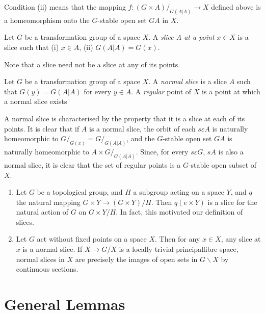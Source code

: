 Condition (ii) means that the mapping $f :(G \times A)/_{G(A | A)}
 \to X$ defined above is a homeomorphism onto the $G$-stable open set
 $GA$ in $X$. 

\begin{defi*}
  Let $G$ be a transformation group of a space $X$.  A \textit{slice A
    at a point} $x \in X$ is a slice such that (i) $x \in A$, (ii) $G(A |
  A)= G(x)$. 
\end{defi*} 
Note that a slice need not be a slice at any of its points.
 
\begin{defi*}
  Let $G$ be a transformation group of a space $X$. A \textit{normal
    slice} is a slice $A$ such that $G(y)=G(A|A)$ for every $y \in
  A$. A \textit{regular} point of $X$ is a point at which a normal
  slice exists  
\end{defi*} 

A normal slice is characterised by the property that it is a slice at
 each of its points. It is clear that if $A$ is a normal slice, the
 orbit of each $s \varepsilon A$ is naturally homeomorphic to
 $G/_{G(x)} = G/_{G(A|A)}$, and the $G$-stable open set $GA$ is
 naturally homeomorphic to $A \times G/_{G(A|A)}$. Since, for every $s
 \varepsilon G$, $sA$ is also a normal slice, it is clear that the set
 of regular points is a $G$-stable open subset of $X$. 

\begin{examples*}
  \begin{enumerate}
    \renewcommand{\labelenumi}{\theenumi)}
  \item  Let $G$ be a topological group, and $H$ a subgroup acting on a
    space $Y$, and $q$ the natural mapping $G \times Y \to (G \times Y)/
    H$. Then $q(e \times Y)$ is a slice for the natural action of $G$ on
    $G \times Y/H$. In fact, this motivated our definition of slices. 

  \item  Let $G$ act without fixed points on a space $X$. Then for any $x
    \in X$, any slice at $x$ is a normal slice. If $X \to G/X$ is a
    locally trivial principal\pageoriginale fibre space, normal slices
    in $X$ are precisely the images of open sets in $G \backslash
    X$ by continuous sections.
  \end{enumerate}
\end{examples*} 


\section{General Lemmas}%

